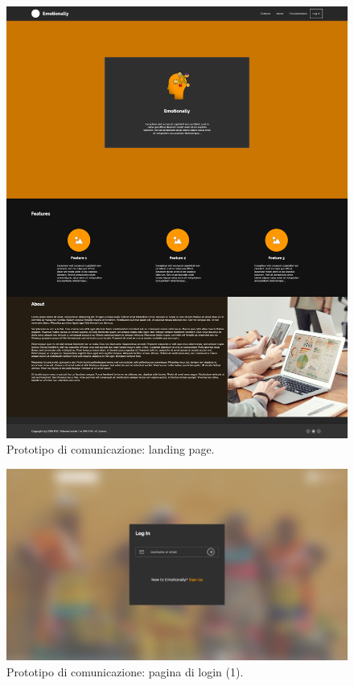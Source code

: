 
\begin{figure}[H]
	\centering
	\caption{Prototipo di comunicazione: landing page.}
	\label{fig:prototipo-comunicazione:landing-page}
	\includegraphics[width=\textwidth]{images/prototipo-comunicazione/Landing.png}
\end{figure}

\begin{figure}[H]
	\centering
	\caption{Prototipo di comunicazione: pagina di login (1).}
	\label{fig:prototipo-comunicazione:login-1}
	\includegraphics[width=\textwidth]{images/prototipo-comunicazione/login-1.png}
\end{figure}

